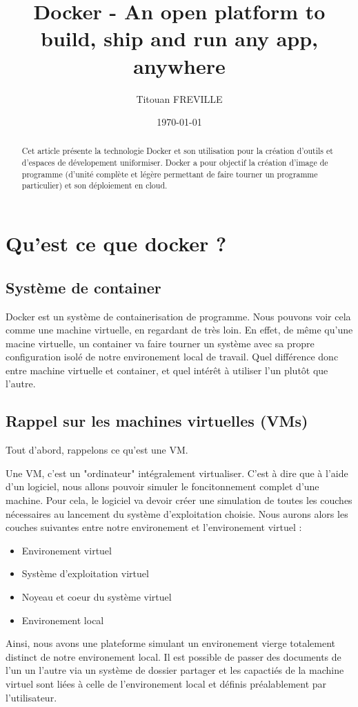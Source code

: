 \documentclass[a4paper,11pt]{article}
\title{Docker - An open platform to build, ship and run any app, anywhere}
\author{Titouan FREVILLE}
\date{\today}
\begin{document}
\maketitle

\begin{abstract}
Cet article présente la technologie Docker et son utilisation pour la création d'outils et d'espaces de dévelopement uniformiser. Docker a pour objectif la création d'image de programme (d'unité complète et légère permettant de faire tourner un programme particulier) et son déploiement en cloud.
\end{abstract}

\section{Qu'est ce que docker ?}
\subsection{Système de container}
Docker est un système de containerisation de programme. Nous pouvons voir cela comme une machine virtuelle, en regardant de très loin. En effet, de même qu'une macine virtuelle, un container va faire tourner un système avec sa propre configuration isolé de notre environement local de travail. Quel différence donc entre machine virtuelle et container, et quel intérêt à utiliser l'un plutôt que l'autre. 
\subsection{Rappel sur les machines virtuelles (VMs)}
Tout d'abord, rappelons ce qu'est une VM.

Une VM, c'est un "ordinateur" intégralement virtualiser. C'est à dire que à l'aide d'un logiciel, nous allons pouvoir simuler le foncitonnement complet d'une machine. Pour cela, le logiciel va devoir créer une simulation de toutes les couches nécessaires au lancement du système d'exploitation choisie. Nous aurons alors les couches suivantes entre notre environement et l'environement virtuel :
\begin{itemize}
 \item Environement virtuel
 \item Système d'exploitation virtuel
 \item Noyeau et coeur du système virtuel
 \item Environement local
\end{itemize}

Ainsi, nous avons une plateforme simulant un environement vierge totalement distinct de notre environement local. Il est possible de passer des documents de l'un un l'autre via un système de dossier partager et les capactiés de la machine virtuel sont liées à celle de l'environement local et définis préalablement par l'utilisateur.
\end{document}
